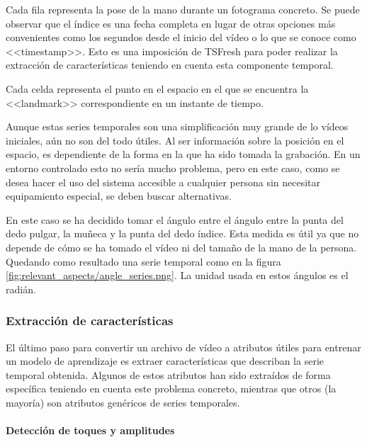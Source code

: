 
Cada fila representa la pose de la mano durante un fotograma concreto. Se puede
observar que el índice es una fecha completa en lugar de otras opciones más
convenientes como los segundos desde el inicio del vídeo o lo que se conoce como
<<timestamp>>. Esto es una imposición de TSFresh para poder realizar la
extracción de características teniendo en cuenta esta componente temporal.

Cada celda representa el punto en el espacio en el que se encuentra la
<<landmark>> correspondiente en un instante de tiempo.

Aunque estas series temporales son una simplificación muy grande de lo vídeos
iniciales, aún no son del todo útiles. Al ser información sobre la posición en
el espacio, es dependiente de la forma en la que ha sido tomada la grabación. En
un entorno controlado esto no sería mucho problema, pero en este caso, como se
desea hacer el uso del sistema accesible a cualquier persona sin necesitar
equipamiento especial, se deben buscar alternativas.

En este caso se ha decidido tomar el ángulo entre el ángulo entre la punta del
dedo pulgar, la muñeca y la punta del dedo índice. Esta medida es útil ya que no
depende de cómo se ha tomado el vídeo ni del tamaño de la mano de la persona.
Quedando como resultado una serie temporal como en la figura
\ref{fig:relevant_aspects/angle_series.png}. La unidad usada en estos ángulos es
el radián.


\subsubsection{Extracción de características}

El último paso para convertir un archivo de vídeo a atributos útiles para
entrenar un modelo de aprendizaje es extraer características que describan la
serie temporal obtenida. Algunos de estos atributos han sido extraídos de forma
específica teniendo en cuenta este problema concreto, mientras que otros (la
mayoría) son atributos genéricos de series temporales.

\paragraph{Detección de toques y amplitudes}

